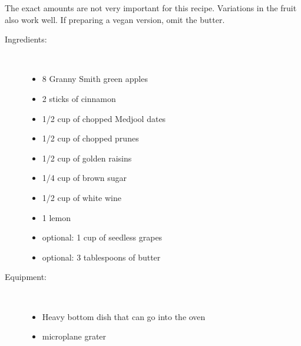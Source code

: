 \documentclass[11pt,letterpaper]{article}
\begin{document}


The exact amounts are not very important for this recipe. Variations in the fruit also work well. If preparing a vegan version, omit the butter. 

\begin{description}

\item[Ingredients:]\ \\
	\begin{itemize}
	\item 8 Granny Smith green apples
	\item 2 sticks of cinnamon 
	\item 1/2 cup of chopped Medjool dates
	\item 1/2 cup of chopped prunes 
	\item 1/2 cup of golden raisins
	\item 1/4 cup of brown sugar
	\item 1/2 cup of white wine
	\item 1 lemon
	\item optional: 1 cup of seedless grapes
	\item optional: 3 tablespoons of butter
	\end{itemize}

\item[Equipment:]\ \\
	\begin{itemize}
	\item Heavy bottom dish that can go into the oven
	\item microplane grater
	\end{itemize}


\end{description}
\end{document}
